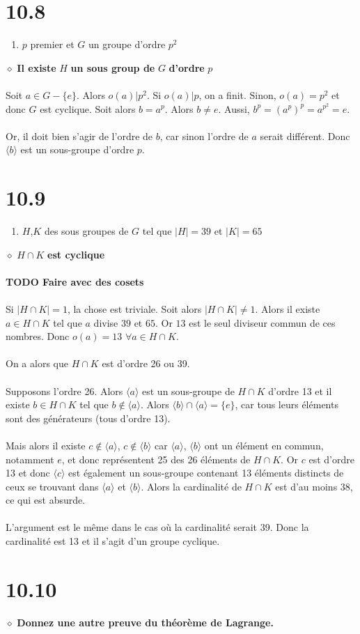 \documentclass[a4paper,10pt]{article}
\begin{document}
\section*{10.8}
\begin{enumerate}
 \item $p$ premier et $G$ un groupe d'ordre $p^2$
\end{enumerate}
$\diamond$ \textbf{Il existe } $H$ \textbf{ un sous group de } $G$ \textbf{ d'ordre } $p$
\\
\\
Soit $a \in G - \{e\}$. Alors $o(a) | p^2$. Si $o(a) | p$, on a finit. Sinon, $o(a) = p^2$
et donc $G$ est cyclique. Soit alors $b = a^p$. Alors $b \not = e$. Aussi, $b^p = (a^p)^p = a^{p^2} = e$.
\\
\\
Or, il doit bien s'agir de l'ordre de $b$, car sinon l'ordre de $a$ serait différent. Donc $ \langle b \rangle$
est un sous-groupe d'ordre $p$.

\section*{10.9}
\begin{enumerate}
 \item $H$,$K$ des sous groupes de $G$ tel que $|H| = 39$ et $|K| = 65$
\end{enumerate}
$\diamond$ $H \cap K$ \textbf{ est cyclique}
\\
\\
\textbf{TODO Faire avec des cosets}
\\
\\
Si $|H \cap K| = 1$, la chose est triviale. Soit alors $|H \cap K| \not = 1$. 
Alors il existe $a \in H \cap K$ tel que $a$ divise $39$ et $65$. Or $13$ est le 
seul diviseur commun de ces nombres. Donc $o(a) = 13$ $\forall a \in H \cap K$. 
\\
\\
On a alors que $H \cap K$ est d'ordre 26 ou 39.
\\
\\
Supposons l'ordre 26. Alors $\langle a \rangle$ est un sous-groupe de $H \cap K$ d'ordre 13
et il existe $b \in H \cap K$ tel que $b \not \in \langle a \rangle$. Alors $\langle b \rangle \cap \langle a \rangle = \{e\}$, 
car tous leurs éléments sont des générateurs (tous d'ordre 13).
\\
\\
Mais alors il existe $c \not \in \langle a \rangle$, $c \not \in \langle b \rangle$ car $\langle a \rangle$, $\langle b \rangle$ ont
un élément en commun, notamment $e$, et donc représentent 25 des 26 éléments de $H \cap K$. 
Or $c$ est d'ordre 13 et donc $\langle c \rangle$ est également un sous-groupe contenant 13
éléments distincts de ceux se trouvant dans $\langle a \rangle$ et $\langle b \rangle$. Alors la cardinalité de $H \cap K$ est d'au
moins 38, ce qui est absurde.
\\
\\
L'argument est le même dans le cas où la cardinalité serait 39. Donc la cardinalité est 13 et il s'agit d'un groupe cyclique.

\section*{10.10}
$\diamond$ \textbf{Donnez une autre preuve du théorème de Lagrange.}
\end{document}
